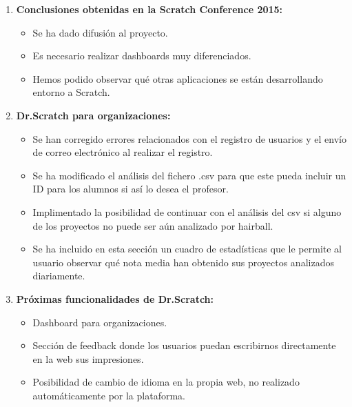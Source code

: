 \documentclass[a4paper,12pt]{letter}
\begin{document}
\begin{letter}
\begin{enumerate}
    
    \item{\textbf {Conclusiones obtenidas en la Scratch Conference 2015:}}
    \begin{itemize}
            \item {Se ha dado difusión al proyecto.}
            \item {Es necesario realizar dashboards muy diferenciados.}
            \item {Hemos podido observar qué otras aplicaciones se están 
                    desarrollando entorno a Scratch.}
    \end{itemize}
    
    \item{\textbf {Dr.Scratch para organizaciones:}}
    \begin{itemize}
            \item {Se han corregido errores relacionados con el registro de usuarios y el envío de correo electrónico al realizar el registro.}
            \item {Se ha modificado el análisis del fichero .csv para que este pueda incluir un ID para los alumnos si así lo desea el profesor.}
            \item {Implimentado la posibilidad de continuar con el análisis del csv si alguno de los proyectos no puede ser aún analizado por hairball.}
            \item {Se ha incluido en esta sección un cuadro de estadísticas que le permite al usuario observar qué nota media han obtenido sus proyectos analizados diariamente.}
    \end{itemize}

    \item{\textbf {Próximas funcionalidades de Dr.Scratch:}}
    \begin{itemize}
        \item {Dashboard para organizaciones.}
        \item {Sección de feedback donde los usuarios puedan escribirnos directamente en la web sus impresiones.}
        \item {Posibilidad de cambio de idioma en la propia web, no realizado automáticamente por la plataforma.}
    \end{itemize}


\end{enumerate}

\end{letter}
\end{document}
